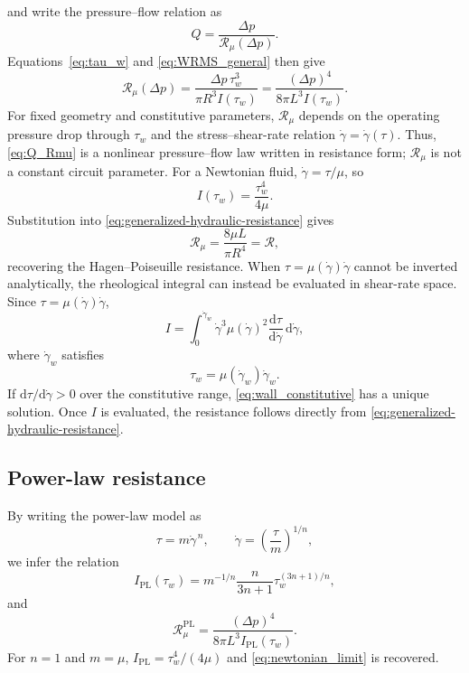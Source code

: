 \documentclass[lineno]{jfm}
\begin{document}
and write the pressure--flow relation as
\begin{equation}
Q
=
\frac{\Delta p}
{\mathcal{R}_{\mu}(\Delta p)}.
\label{eq:Q_Rmu}
\end{equation}
Equations~\eqref{eq:tau_w} and \eqref{eq:WRMS_general} then give
\begin{equation}
\mathcal{R}_{\mu}(\Delta p)
=
\frac{\Delta p\,\tau_w^3}
{\pi R^3 I(\tau_w)}
=
\frac{(\Delta p)^4}
{8\pi L^3 I(\tau_w)}.
\label{eq:generalized-hydraulic-resistance}
\end{equation}
For fixed geometry and constitutive parameters,
$\mathcal{R}_{\mu}$ depends on the operating pressure drop through
$\tau_w$ and the stress--shear-rate relation
$\dot{\gamma}=\dot{\gamma}(\tau)$. Thus,
\eqref{eq:Q_Rmu} is a nonlinear pressure--flow law written in resistance form;
$\mathcal{R}_{\mu}$ is not a constant circuit parameter.
For a Newtonian fluid,
$\dot{\gamma}=\tau/\mu$, so
\[
I(\tau_w)
=
\frac{\tau_w^4}{4\mu}.
\]
Substitution into \eqref{eq:generalized-hydraulic-resistance} gives
\begin{equation}
\mathcal{R}_{\mu}
=
\frac{8\mu L}{\pi R^4}
=
\mathcal{R},
\label{eq:newtonian_limit}
\end{equation}
recovering the Hagen--Poiseuille resistance.
When
$\tau=\mu(\dot{\gamma})\dot{\gamma}$
cannot be inverted analytically, the rheological integral can instead be
evaluated in shear-rate space. Since
$\tau=\mu(\dot{\gamma})\dot{\gamma}$,
\begin{equation}
I
=
\int_0^{\dot{\gamma}_w}
\dot{\gamma}^3
\mu(\dot{\gamma})^2
\frac{\mathrm{d}\tau}{\mathrm{d}\dot{\gamma}}
\,\mathrm{d}\dot{\gamma},
\label{eq:I_gamma_form}
\end{equation}
where $\dot{\gamma}_w$ satisfies
\begin{equation}
\tau_w
=
\mu(\dot{\gamma}_w)\dot{\gamma}_w.
\label{eq:wall_constitutive}
\end{equation}
If
$\mathrm{d}\tau/\mathrm{d}\dot{\gamma}>0$
over the constitutive range, \eqref{eq:wall_constitutive} has a unique
solution. Once $I$ is evaluated, the resistance follows directly from
\eqref{eq:generalized-hydraulic-resistance}.
\subsection{Power-law resistance}
By writing the power-law model as
\begin{equation}
\tau
=
m\dot{\gamma}^{\,n},
\qquad
\dot{\gamma}
=
\left(\frac{\tau}{m}\right)^{1/n},
\label{eq:pl_tau_gamma}
\end{equation}
we infer the relation
\begin{equation}
I_{\mathrm{PL}}(\tau_w)
=
m^{-1/n}
\frac{n}{3n+1}
\tau_w^{(3n+1)/n},
\label{eq:I_PL}
\end{equation}
and
\begin{equation}
\mathcal{R}_{\mu}^{\mathrm{PL}}
=
\frac{(\Delta p)^4}
{8\pi L^3 I_{\mathrm{PL}}(\tau_w)}.
\label{eq:R_PL}
\end{equation}
For $n=1$ and $m=\mu$,
$I_{\mathrm{PL}}=\tau_w^4/(4\mu)$ and
\eqref{eq:newtonian_limit} is recovered.
\end{document}
